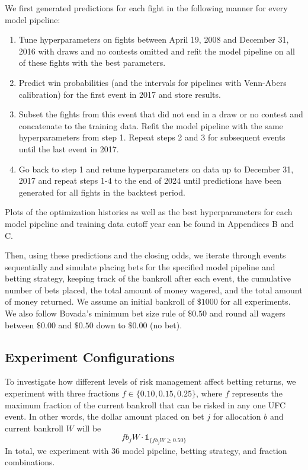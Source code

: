 \documentclass[12pt,twoside]{report}
\begin{document}
We first generated predictions for each fight in the following manner for every model pipeline:
\begin{enumerate}
    \item Tune hyperparameters on fights between April 19, 2008 and December 31, 2016 with draws and no contests omitted and refit the model pipeline on all of these fights with the best parameters.

    \item Predict win probabilities (and the intervals for pipelines with Venn-Abers calibration) for the first event in 2017 and store results.

    \item Subset the fights from this event that did not end in a draw or no contest and concatenate to the training data. Refit the model pipeline with the same hyperparameters from step 1. Repeat steps 2 and 3 for subsequent events until the last event in 2017.

    \item Go back to step 1 and retune hyperparameters on data up to December 31, 2017 and repeat steps 1-4 to the end of 2024 until predictions have been generated for all fights in the backtest period.
\end{enumerate}
Plots of the optimization histories as well as the best hyperparameters for each model pipeline and training data cutoff year can be found in Appendices B and C.

Then, using these predictions and the closing odds, we iterate through events sequentially and simulate placing bets for the specified model pipeline and betting strategy, keeping track of the bankroll after each event, the cumulative number of bets placed, the total amount of money wagered, and the total amount of money returned. We assume an initial bankroll of $\$1000$ for all experiments. We also follow Bovada's minimum bet size rule of $\$0.50$ and round all wagers between $\$0.00$ and $\$0.50$ down to $\$0.00$ (no bet).

\subsection{Experiment Configurations}

To investigate how different levels of risk management affect betting returns, we experiment with three fractions $f \in \{0.10, 0.15, 0.25\}$, where $f$ represents the maximum fraction of the current bankroll that can be risked in any one UFC event. In other words, the dollar amount placed on bet $j$ for allocation $b$ and current bankroll $W$ will be 
$$fb_jW \cdot \mathds{1}_{\{fb_jW \geq 0.50\}}$$
In total, we experiment with $36$ model pipeline, betting strategy, and fraction combinations.
\end{document}

